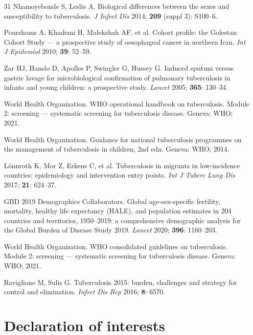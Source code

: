 \documentclass[12pt]{article}
\begin{document}
\begin{thebibliography}{31}
Nhamoyebonde S, Leslie A. Biological differences between the sexes and susceptibility to tuberculosis. \textit{J Infect Dis} 2014; \textbf{209} (suppl 3): S100--6.

Pourshams A, Khademi H, Malekshah AF, et al. Cohort profile: the Golestan Cohort Study --- a prospective study of oesophageal cancer in northern Iran. \textit{Int J Epidemiol} 2010; \textbf{39}: 52--59.

Zar HJ, Hanslo D, Apolles P, Swingler G, Hussey G. Induced sputum versus gastric lavage for microbiological confirmation of pulmonary tuberculosis in infants and young children: a prospective study. \textit{Lancet} 2005; \textbf{365}: 130--34.

World Health Organization. WHO operational handbook on tuberculosis. Module 2: screening --- systematic screening for tuberculosis disease. Geneva: WHO; 2021.

World Health Organization. Guidance for national tuberculosis programmes on the management of tuberculosis in children, 2nd edn. Geneva: WHO; 2014.

L{\"o}nnroth K, Mor Z, Erkens C, et al. Tuberculosis in migrants in low-incidence countries: epidemiology and intervention entry points. \textit{Int J Tuberc Lung Dis} 2017; \textbf{21}: 624--37.

GBD 2019 Demographics Collaborators. Global age-sex-specific fertility, mortality, healthy life expectancy (HALE), and population estimates in 204 countries and territories, 1950--2019: a comprehensive demographic analysis for the Global Burden of Disease Study 2019. \textit{Lancet} 2020; \textbf{396}: 1160--203.

World Health Organization. WHO consolidated guidelines on tuberculosis. Module 2: screening --- systematic screening for tuberculosis disease. Geneva: WHO; 2021.

Raviglione M, Sulis G. Tuberculosis 2015: burden, challenges and strategy for control and elimination. \textit{Infect Dis Rep} 2016; \textbf{8}: 6570.

\end{thebibliography}


\clearpage

\section*{Declaration of interests}
\end{document}
